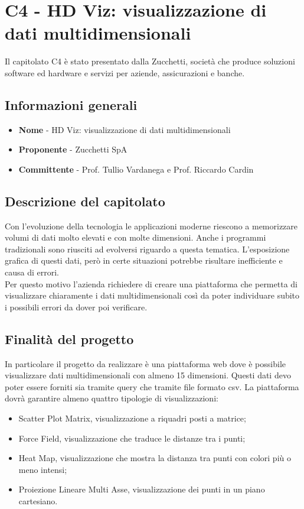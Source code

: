 \chapter{C4 - HD Viz: visualizzazione di dati multidimensionali}
Il capitolato C4 è stato presentato dalla Zucchetti, società che produce soluzioni software ed hardware e servizi per aziende, assicurazioni e banche.
\section{Informazioni generali}
\begin{itemize}
	\item \textbf{Nome} - HD Viz: visualizzazione di dati multidimensionali
	\item \textbf{Proponente} - Zucchetti SpA
	\item \textbf{Committente} - Prof. Tullio Vardanega e Prof. Riccardo Cardin
\end{itemize}
\section{Descrizione del capitolato}
Con l'evoluzione della tecnologia le applicazioni moderne riescono a memorizzare volumi di dati molto elevati e con molte dimensioni. Anche i programmi tradizionali sono riusciti ad evolversi riguardo a questa tematica. L'esposizione grafica di questi dati, però in certe situazioni potrebbe risultare inefficiente e causa di errori. \\
Per questo motivo l'azienda richiedere di creare una piattaforma che permetta di visualizzare chiaramente i dati multidimensionali così da poter individuare subito i possibili errori da dover poi verificare.
\section{Finalità del progetto}
In particolare il progetto da realizzare è una piattaforma web dove è possibile visualizzare dati multidimensionali con almeno 15 dimensioni. Questi dati devo poter essere forniti sia tramite query che tramite file formato csv. La piattaforma dovrà garantire almeno quattro tipologie di visualizzazioni:
\begin{itemize}
	\item Scatter Plot Matrix, visualizzazione a riquadri posti a matrice;
	\item Force Field, visualizzazione che traduce le distanze tra i punti;
	\item Heat Map, visualizzazione che mostra la distanza tra punti con colori più o meno intensi;
	\item Proiezione Lineare Multi Asse, visualizzazione dei punti in un piano cartesiano.
\end{itemize}

